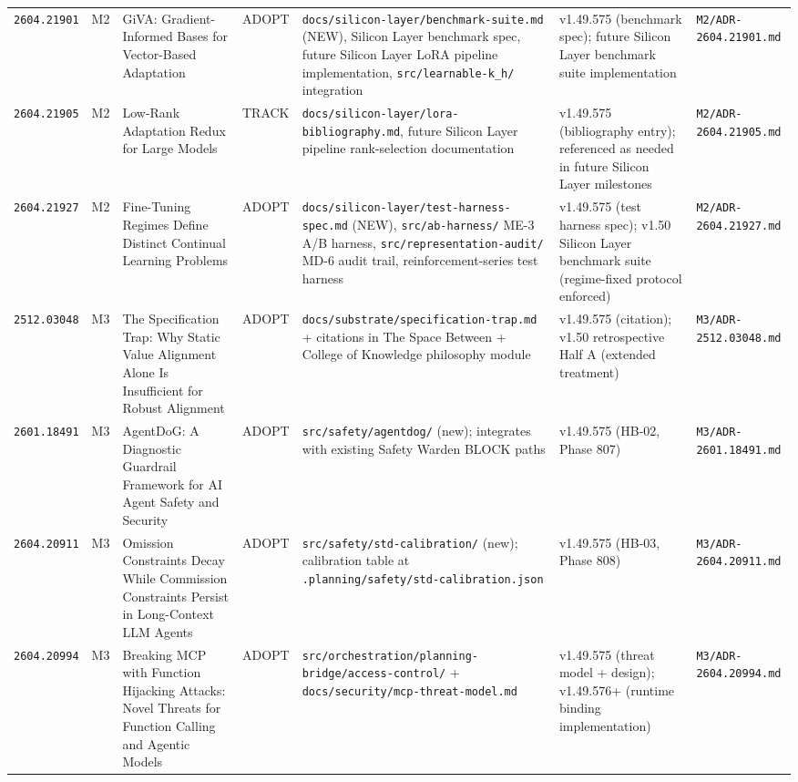 \documentclass[11pt,letterpaper]{article}
\newcommand{\arxivid}[1]{\texttt{\textcolor{accent}{#1}}}
\begin{document}
\begin{footnotesize}
\begin{longtable}{@{}L{0.10\textwidth} L{0.025\textwidth} L{0.22\textwidth} L{0.06\textwidth} L{0.20\textwidth} L{0.13\textwidth} L{0.13\textwidth}@{}}
\arxivid{2604.21901} & M2 & GiVA: Gradient-Informed Bases for Vector-Based Adaptation & ADOPT & \texttt{docs/silicon-layer/benchmark-suite.md} (NEW), Silicon Layer benchmark spec, future Silicon Layer LoRA pipeline implementation, \texttt{src/learnable-k\_h/} integration & v1.49.575 (benchmark spec); future Silicon Layer benchmark suite implementation & \texttt{\small M2/ADR-2604.21901.md} \\
\arxivid{2604.21905} & M2 & Low-Rank Adaptation Redux for Large Models & TRACK & \texttt{docs/silicon-layer/lora-bibliography.md}, future Silicon Layer pipeline rank-selection documentation & v1.49.575 (bibliography entry); referenced as needed in future Silicon Layer milestones & \texttt{\small M2/ADR-2604.21905.md} \\
\arxivid{2604.21927} & M2 & Fine-Tuning Regimes Define Distinct Continual Learning Problems & ADOPT & \texttt{docs/silicon-layer/test-harness-spec.md} (NEW), \texttt{src/ab-harness/} ME-3 A/B harness, \texttt{src/representation-audit/} MD-6 audit trail, reinforcement-series test harness & v1.49.575 (test harness spec); v1.50 Silicon Layer benchmark suite (regime-fixed protocol enforced) & \texttt{\small M2/ADR-2604.21927.md} \\
\arxivid{2512.03048} & M3 & The Specification Trap: Why Static Value Alignment Alone Is Insufficient for Robust Alignment & ADOPT & \texttt{docs/substrate/specification-trap.md} + citations in The Space Between + College of Knowledge philosophy module & v1.49.575 (citation); v1.50 retrospective Half A (extended treatment) & \texttt{\small M3/ADR-2512.03048.md} \\
\arxivid{2601.18491} & M3 & AgentDoG: A Diagnostic Guardrail Framework for AI Agent Safety and Security & ADOPT & \texttt{src/safety/agentdog/} (new); integrates with existing Safety Warden BLOCK paths & v1.49.575 (HB-02, Phase 807) & \texttt{\small M3/ADR-2601.18491.md} \\
\arxivid{2604.20911} & M3 & Omission Constraints Decay While Commission Constraints Persist in Long-Context LLM Agents & ADOPT & \texttt{src/safety/std-calibration/} (new); calibration table at \texttt{.planning/safety/std-calibration.json} & v1.49.575 (HB-03, Phase 808) & \texttt{\small M3/ADR-2604.20911.md} \\
\arxivid{2604.20994} & M3 & Breaking MCP with Function Hijacking Attacks: Novel Threats for Function Calling and Agentic Models & ADOPT & \texttt{src/orchestration/planning-bridge/access-control/} + \texttt{docs/security/mcp-threat-model.md} & v1.49.575 (threat model + design); v1.49.576+ (runtime binding implementation) & \texttt{\small M3/ADR-2604.20994.md} \\

\end{longtable}
\end{footnotesize}
\end{document}
